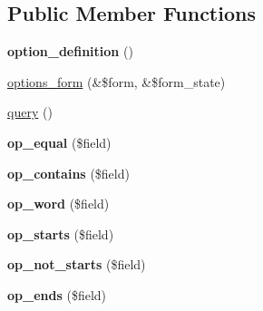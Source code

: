 \subsection*{Public Member Functions}
\begin{DoxyCompactItemize}
\item 
\hypertarget{classviews__handler__filter__combine_add0f598f7a8951dcb561140bbf265855}{
{\bfseries option\_\-definition} ()}
\label{classviews__handler__filter__combine_add0f598f7a8951dcb561140bbf265855}

\item 
\hyperlink{classviews__handler__filter__combine_ab9cd16cf6ee4450ea0b20ab20ebb920c}{options\_\-form} (\&\$form, \&\$form\_\-state)
\item 
\hyperlink{classviews__handler__filter__combine_adcae1e0d8c9349fdc10c000bb62f0b50}{query} ()
\item 
\hypertarget{classviews__handler__filter__combine_a5a7edbaa51c0323b72702e111ecd9684}{
{\bfseries op\_\-equal} (\$field)}
\label{classviews__handler__filter__combine_a5a7edbaa51c0323b72702e111ecd9684}

\item 
\hypertarget{classviews__handler__filter__combine_ab6274d1f6fb9486cb4f133194961d04c}{
{\bfseries op\_\-contains} (\$field)}
\label{classviews__handler__filter__combine_ab6274d1f6fb9486cb4f133194961d04c}

\item 
\hypertarget{classviews__handler__filter__combine_adb7c566d5aada503132917a8997bc5fe}{
{\bfseries op\_\-word} (\$field)}
\label{classviews__handler__filter__combine_adb7c566d5aada503132917a8997bc5fe}

\item 
\hypertarget{classviews__handler__filter__combine_a07fd8925a8da6c097e4497b0b74b1865}{
{\bfseries op\_\-starts} (\$field)}
\label{classviews__handler__filter__combine_a07fd8925a8da6c097e4497b0b74b1865}

\item 
\hypertarget{classviews__handler__filter__combine_a86ec81b3360921220aeb40c1e4931aff}{
{\bfseries op\_\-not\_\-starts} (\$field)}
\label{classviews__handler__filter__combine_a86ec81b3360921220aeb40c1e4931aff}

\item 
\hypertarget{classviews__handler__filter__combine_a56344ed90a73d05ce55caed591ac7c72}{
{\bfseries op\_\-ends} (\$field)}
\label{classviews__handler__filter__combine_a56344ed90a73d05ce55caed591ac7c72}


\end{DoxyCompactItemize}
